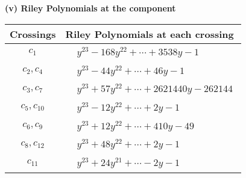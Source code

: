 \documentclass[1p]{elsarticle_modified}
\theoremstyle{definition}
\begin{document}
\newpage\renewcommand{\arraystretch}{1}
\flushleft \textbf{(v) Riley Polynomials at the component}\newline \\
\begin{tabular}{m{50pt}|m{274pt}}
Crossings & \hspace{64pt}Riley Polynomials at each crossing \\
\hline $$\begin{aligned}c_{1}\end{aligned}$$&$\begin{aligned}
&y^{23}-168 y^{22}+\cdots+3538 y-1
\end{aligned}$\\
\hline $$\begin{aligned}c_{2},c_{4}\end{aligned}$$&$\begin{aligned}
&y^{23}-44 y^{22}+\cdots+46 y-1
\end{aligned}$\\
\hline $$\begin{aligned}c_{3},c_{7}\end{aligned}$$&$\begin{aligned}
&y^{23}+57 y^{22}+\cdots+2621440 y-262144
\end{aligned}$\\
\hline $$\begin{aligned}c_{5},c_{10}\end{aligned}$$&$\begin{aligned}
&y^{23}-12 y^{22}+\cdots+2 y-1
\end{aligned}$\\
\hline $$\begin{aligned}c_{6},c_{9}\end{aligned}$$&$\begin{aligned}
&y^{23}+12 y^{22}+\cdots+410 y-49
\end{aligned}$\\
\hline $$\begin{aligned}c_{8},c_{12}\end{aligned}$$&$\begin{aligned}
&y^{23}+48 y^{22}+\cdots+2 y-1
\end{aligned}$\\
\hline $$\begin{aligned}c_{11}\end{aligned}$$&$\begin{aligned}
&y^{23}+24 y^{21}+\cdots-2 y-1
\end{aligned}$\\
\hline
\end{tabular}\\~\\
\end{document}
